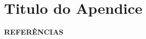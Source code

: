 \documentclass[12pt,a4paper]{report}
\theoremstyle{definition}
\begin{document}





\appendix
\chapter{Titulo do Apendice}\label{apendice}

\newpage
\begingroup
\let\clearpage\relax
\begin{center}
 \MakeUppercase{\bf Referências}
\end{center}


 
\endgroup
\end{document}
